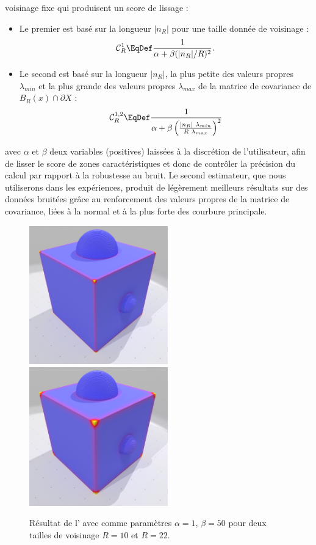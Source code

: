 voisinage fixe qui produisent un score de lissage :
%
\begin{itemize}
%
  \item Le premier est basé sur la longueur $|n_R|$ pour une taille donnée de
  voisinage :
  \begin{equation}
    \mathcal{C}_{R}^{1} \EqDef \frac{1}{\alpha + \beta(|n_R|/R)^2} \text{.}
    \label{eq:moment-C0}
  \end{equation}
%
  \item Le second est basé sur la longueur $|n_R|$, la plus petite des valeurs
  propres $\lambda_{min}$ et la plus grande des valeurs propres $\lambda_{max}$
  de la matrice de covariance de $B_R(x)\cap \partial X$ :
  \begin{equation}
    \mathcal{C}_{R}^{1,2} \EqDef \frac{1}{\alpha + \beta
    \left( \frac{|n_R|~\lambda_{min}}{R~\lambda_{max}} \right)^2}
    \label{eq:moment-C1}
  \end{equation}
%
\end{itemize}
%
avec $\alpha$ et $\beta$ deux variables (positives) laissées à la discrétion de
l'utilisateur, afin de lisser le score de zones caractéristiques et donc de
contrôler la précision du calcul par rapport à la robustesse au bruit. Le second
estimateur, que nous utiliserons dans les expériences, produit de légèrement
meilleurs résultats sur des données bruitées grâce au renforcement des valeurs
propres de la matrice de covariance, liées à la normal et à la plus forte des
courbure principale.
%
%
\begin{figure}[hbt]
  \centering
  \includegraphics[height=6cm]{images/Feature/CubeSphere_Moments_r_10_c1}
  \includegraphics[height=6cm]{images/Feature/CubeSphere_Moments_r_22_c1}
  \caption[Résultat de l']{Résultat de l' avec comme paramètres $\alpha = 1$, $\beta = 50$ pour deux tailles de voisinage $R = 10$ et $R = 22$.}\label{fig:moment-C1}
\end{figure}
